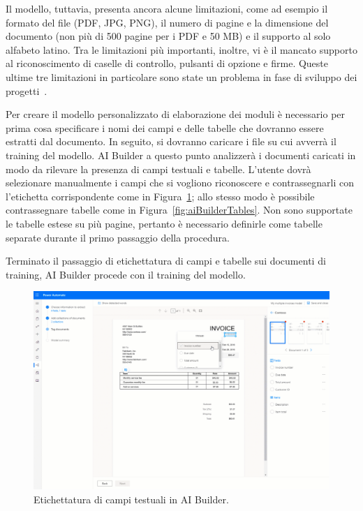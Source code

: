Il modello, tuttavia, presenta ancora alcune limitazioni, come ad esempio il formato del file (PDF, JPG, PNG), il numero di pagine  e la dimensione del documento (non più di 500 pagine per i PDF e 50 MB) e il supporto al solo alfabeto latino.
Tra le limitazioni più importanti, inoltre, vi è il mancato supporto al riconoscimento di caselle di controllo, pulsanti di opzione e firme. Queste ultime tre limitazioni in particolare sono state un problema in fase di sviluppo dei progetti~\cite{LimitazioniAIBuilder}.

Per creare il modello personalizzato di elaborazione dei moduli è necessario per prima cosa specificare i nomi dei campi e delle tabelle che dovranno essere estratti dal documento.
In seguito, si dovranno caricare i file su cui avverrà il training del modello. AI Builder a questo punto analizzerà i documenti caricati in modo da rilevare la presenza di campi testuali e tabelle.
L'utente dovrà  selezionare manualmente i campi che si vogliono riconoscere e contrassegnarli con l'etichetta corrispondente come in Figura~\ref{fig:aiBuilderFields}; allo stesso modo è possibile contrassegnare tabelle come in Figura~\ref{fig:aiBuilderTables}. Non sono supportate le tabelle estese su più pagine, pertanto è necessario definirle come tabelle separate durante il primo passaggio della procedura.

Terminato il passaggio di etichettatura di campi e tabelle sui documenti di training, AI Builder procede con il training del modello.

\begin{figure}[ht]
  \centering
  \includegraphics[width=\textwidth]{ai-builder-fields.png}
  \caption{Etichettatura di campi testuali in AI Builder.}
  \label{fig:aiBuilderFields}
\end{figure}

